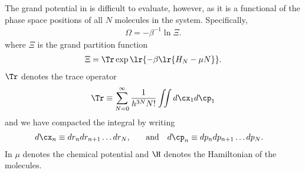 {The grand potential in  is difficult to evaluate, however,
as it is a functional of the 
phase space positions of all $N$ molecules in the system.
Specifically,  
\begin{align}
  \Omega = -\beta^{-1}\ln \Xi.
\end{align}
where $\Xi$ is the grand partition function
\begin{align}
  \Xi = \Tr \exp\lr{-\beta \lr{H_N - \mu N}}. \label{eqn:nuc:GPF}
\end{align}
 $\Tr$ denotes the trace operator
\begin{align}
  \Tr \equiv \sum_{N=0}^\infty \frac{1}{h^{3N}N!} \iint d\cx_1 d\cp_1
\end{align}
and we have compacted the integral by writing 
\begin{align}
d\cx_n &\equiv dr_n dr_{n+1}\ldots dr_N, &&\quad\text{and}&
d\cp_n &\equiv  dp_n dp_{n+1}\ldots dp_N.
\label{eqn:dshorthand}
\end{align}
In  $\mu$ denotes the chemical potential and $\H$ denotes the Hamiltonian of the molecules.

}
